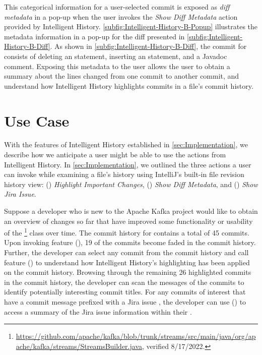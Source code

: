 This categorical information for a user-selected commit is exposed as \emph{diff metadata} in a pop-up when the user invokes the \textit{Show Diff Metadata} action provided by Intelligent History.
\autoref{subfig:Intelligent-History-B-Popup} illustrates the metadata information in a pop-up for the diff presented in \autoref{subfig:Intelligent-History-B-Diff}.
As shown in \autoref{subfig:Intelligent-History-B-Diff}, the commit  for  consists of deleting an  statement, 
inserting an  statement, and  a Javadoc comment.
Exposing this metadata to the user allows the user to obtain a summary about the lines changed from one commit to another commit, 
and understand how Intelligent History highlights commits in a file's commit history.

\section{Use Case}
\label{sec:Use-Case}

With the features of Intelligent History established in \autoref{sec:Implementation}, we describe how we anticipate a user might be able to use the actions from Intelligent History. 
In \autoref{sec:Implementation}, we outlined the three actions a user can invoke while examining a file's history using IntelliJ's built-in file revision history view: 
() \textit{Highlight Important Changes}, 
() \textit{Show Diff Metadata}, and 
() \textit{Show Jira Issue}.

Suppose a developer who is new to the Apache Kafka project would like to obtain an 
overview of changes so far that have improved some functionality or usability of 
the \footnote{\url{https://github.com/apache/kafka/blob/trunk/streams/src/main/java/org/apache/kafka/streams/StreamsBuilder.java}, verified 8/17/2022.} class over time.
The commit history for  contains a total of 45 commits.
Upon invoking feature (), 19 of the commits become faded in the commit history.
Further, the developer can select any commit from the commit history and call feature () to understand how Intelligent History's highlighting has been applied on the  commit history.
Browsing through the remaining 26 highlighted commits in the  commit history, the developer can scan the messages of the commits to identify potentially interesting commit titles.
For any commits of interest that have a commit message prefixed with a Jira issue , the developer can use () to access a summary of the Jira issue information within their .

